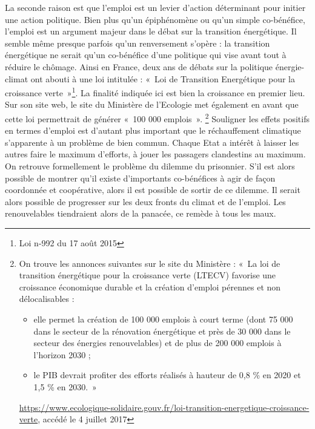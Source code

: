 La seconde raison est que l’emploi est un levier d’action déterminant pour initier une action politique. Bien plus qu’un épiphénomène ou qu’un simple co-bénéfice, l’emploi est un argument majeur dans le débat sur la transition énergétique. Il semble même presque parfois qu’un renversement s’opère : la transition énergétique ne serait qu’un co-bénéfice d’une politique qui vise avant tout à réduire le chômage. Ainsi en France, deux ans de débats sur la politique énergie-climat ont abouti à une loi intitulée : «~Loi de Transition Energétique pour la croissance verte~»\footnote{Loi n-992 du 17 août 2015
}. La finalité indiquée ici est bien la croissance en premier lieu. Sur son site web, le site du Ministère de l'Ecologie met également en avant que cette loi permettrait de générer «~100 000 emplois~». \footnote{On trouve les annonces suivantes sur le site du Ministère : «~La loi de transition énergétique pour la croissance verte (LTECV) favorise une croissance économique durable et la création d'emploi pérennes et non délocalisables :
\begin{itemize}
	\item elle permet la création de 100 000 emplois à court terme (dont 75 000 dans le secteur de la rénovation énergétique et près de 30 000 dans le secteur des énergies renouvelables) et de plus de 200 000 emplois à l’horizon 2030 ;
	\item le PIB devrait profiter des efforts réalisés à hauteur de 0,8 \% en 2020 et 1,5 \% en 2030.~»
\end{itemize}
\url{https://www.ecologique-solidaire.gouv.fr/loi-transition-energetique-croissance-verte}, accédé le 4 juillet 2017
}
Souligner les effets positifs en termes d’emploi est d’autant plus important que le réchauffement climatique s’apparente à un problème de bien commun. Chaque Etat a intérêt à laisser les autres faire le maximum d’efforts, à jouer les passagers clandestins au maximum. On retrouve formellement le problème du dilemme du prisonnier.
S’il est alors possible de montrer qu’il existe d’importants co-bénéfices à agir de façon coordonnée et coopérative, alors il est possible de sortir de ce dilemme. Il serait alors possible de progresser sur les deux fronts du climat et de l’emploi. Les renouvelables tiendraient alors de la panacée, ce remède à tous les maux. 

